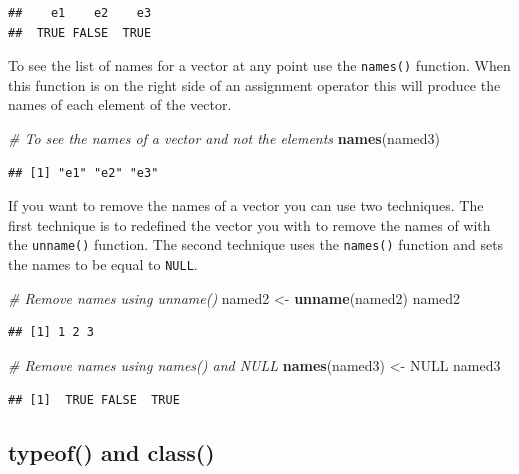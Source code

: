 \documentclass[
]{book}
\newenvironment{Shaded}{\begin{snugshade}}{\end{snugshade}}
\newcommand{\CommentTok}[1]{\textcolor[rgb]{0.56,0.35,0.01}{\textit{#1}}}
\newcommand{\KeywordTok}[1]{\textcolor[rgb]{0.13,0.29,0.53}{\textbf{#1}}}
\newcommand{\NormalTok}[1]{#1}
\newcommand{\OtherTok}[1]{\textcolor[rgb]{0.56,0.35,0.01}{#1}}
\newcommand{\StringTok}[1]{\textcolor[rgb]{0.31,0.60,0.02}{#1}}
\begin{document}
\begin{verbatim}
##    e1    e2    e3 
##  TRUE FALSE  TRUE
\end{verbatim}

To see the list of names for a vector at any point use the \texttt{names()} function. When this function is on the right side of an assignment operator this will produce the names of each element of the vector.

\begin{Shaded}
\begin{Highlighting}[]
\CommentTok{# To see the names of a vector and not the elements}
\KeywordTok{names}\NormalTok{(named3)}
\end{Highlighting}
\end{Shaded}

\begin{verbatim}
## [1] "e1" "e2" "e3"
\end{verbatim}

If you want to remove the names of a vector you can use two techniques. The first technique is to redefined the vector you with to remove the names of with the \texttt{unname()} function. The second technique uses the \texttt{names()} function and sets the names to be equal to \texttt{NULL}.

\begin{Shaded}
\begin{Highlighting}[]
\CommentTok{# Remove names using unname()}
\NormalTok{named2 <-}\StringTok{ }\KeywordTok{unname}\NormalTok{(named2)}
\NormalTok{named2}
\end{Highlighting}
\end{Shaded}

\begin{verbatim}
## [1] 1 2 3
\end{verbatim}

\begin{Shaded}
\begin{Highlighting}[]
\CommentTok{# Remove names using names() and NULL}
\KeywordTok{names}\NormalTok{(named3) <-}\StringTok{ }\OtherTok{NULL}
\NormalTok{named3}
\end{Highlighting}
\end{Shaded}

\begin{verbatim}
## [1]  TRUE FALSE  TRUE
\end{verbatim}

\hypertarget{typeof-and-class}{%
\subsection{typeof() and class()}\label{typeof-and-class}}
\end{document}
